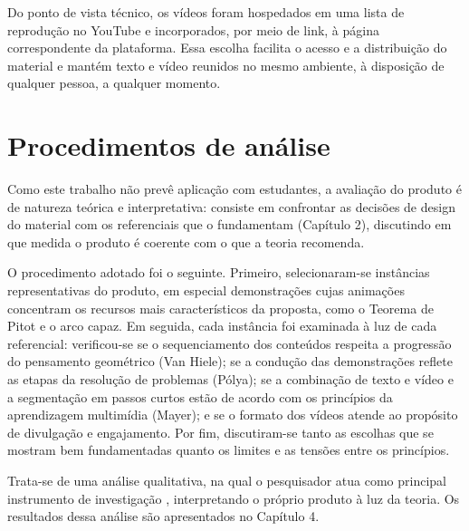 
Do ponto de vista técnico, os vídeos foram hospedados em uma lista de reprodução no YouTube e incorporados, por meio de link, à página correspondente da plataforma. Essa escolha facilita o acesso e a distribuição do material e mantém texto e vídeo reunidos no mesmo ambiente, à disposição de qualquer pessoa, a qualquer momento.

\section{Procedimentos de análise}

Como este trabalho não prevê aplicação com estudantes, a avaliação do produto é de natureza teórica e interpretativa: consiste em confrontar as decisões de design do material com os referenciais que o fundamentam (Capítulo 2), discutindo em que medida o produto é coerente com o que a teoria recomenda.

O procedimento adotado foi o seguinte. Primeiro, selecionaram-se instâncias representativas do produto, em especial demonstrações cujas animações concentram os recursos mais característicos da proposta, como o Teorema de Pitot e o arco capaz. Em seguida, cada instância foi examinada à luz de cada referencial: verificou-se se o sequenciamento dos conteúdos respeita a progressão do pensamento geométrico (Van Hiele); se a condução das demonstrações reflete as etapas da resolução de problemas (Pólya); se a combinação de texto e vídeo e a segmentação em passos curtos estão de acordo com os princípios da aprendizagem multimídia (Mayer); e se o formato dos vídeos atende ao propósito de divulgação e engajamento. Por fim, discutiram-se tanto as escolhas que se mostram bem fundamentadas quanto os limites e as tensões entre os princípios.

Trata-se de uma análise qualitativa, na qual o pesquisador atua como principal instrumento de investigação \cite{ludke1986pesquisa}, interpretando o próprio produto à luz da teoria. Os resultados dessa análise são apresentados no Capítulo 4.
